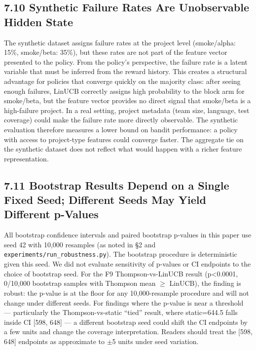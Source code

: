 \documentclass[10pt]{article}
\begin{document}
\subsection{7.10 Synthetic Failure Rates Are Unobservable Hidden
State}\label{synthetic-failure-rates-are-unobservable-hidden-state}

The synthetic dataset assigns failure rates at the project level
(smoke/alpha: 15\%, smoke/beta: 35\%), but these rates are not part of
the feature vector presented to the policy. From the policy's
perspective, the failure rate is a latent variable that must be inferred
from the reward history. This creates a structural advantage for
policies that converge quickly on the majority class: after seeing
enough failures, LinUCB correctly assigns high probability to the block
arm for smoke/beta, but the feature vector provides no direct signal
that smoke/beta is a high-failure project. In a real setting, project
metadata (team size, language, test coverage) could make the failure
rate more directly observable. The synthetic evaluation therefore
measures a lower bound on bandit performance: a policy with access to
project-type features could converge faster. The aggregate tie on the
synthetic dataset does not reflect what would happen with a richer
feature representation.

\subsection{7.11 Bootstrap Results Depend on a Single Fixed Seed;
Different Seeds May Yield Different
p-Values}\label{bootstrap-results-depend-on-a-single-fixed-seed-different-seeds-may-yield-different-p-values}

All bootstrap confidence intervals and paired bootstrap p-values in this
paper use seed 42 with 10,000 resamples (as noted in §2 and
\texttt{experiments/run\_robustness.py}). The bootstrap procedure is
deterministic given this seed. We did not evaluate sensitivity of
p-values or CI endpoints to the choice of bootstrap seed. For the F9
Thompson-vs-LinUCB result (p\textless0.0001, 0/10,000 bootstrap samples
with Thompson mean $\geq$ LinUCB), the finding is robust: the p-value is at
the floor for any 10,000-resample procedure and will not change under
different seeds. For findings where the p-value is near a threshold ---
particularly the Thompson-vs-static ``tied'' result, where static=644.5
falls inside CI {[}598, 648{]} --- a different bootstrap seed could
shift the CI endpoints by a few units and change the coverage
interpretation. Readers should treat the {[}598, 648{]} endpoints as
approximate to $\pm$5 units under seed variation.
\end{document}
